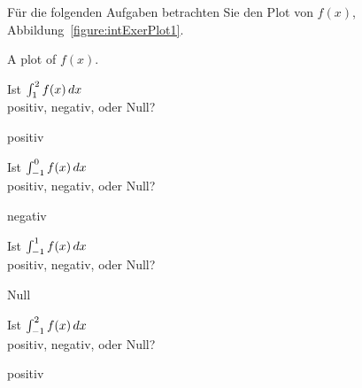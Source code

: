 \begin{exercises}

\noindent Für die folgenden Aufgaben betrachten Sie den Plot von $f(x)$, Abbildung~\ref{figure:intExerPlot1}.
\begin{marginfigure}
\caption{A plot of $f(x)$.}
\label{figure:intExerPlot1}
\end{marginfigure}
\twocol
\begin{exercise}
Ist $\int_1^2 f(x) \, d x$ \\
positiv, negativ, oder Null?
\begin{answer}
positiv
\end{answer}
\end{exercise}

\begin{exercise}
Ist $\int_{-1}^0 f(x) \, d x$ \\
positiv, negativ, oder Null?
\begin{answer}
negativ
\end{answer}
\end{exercise}

\begin{exercise}
Ist $\int_{-1}^1 f(x) \, d x$ \\
positiv, negativ, oder Null?
\begin{answer}
Null
\end{answer}
\end{exercise}

\begin{exercise}
Ist $\int_{-1}^2 f(x) \, d x$ \\
positiv, negativ, oder Null?
\begin{answer}
positiv
\end{answer}
\end{exercise}

\endtwocol


\end{exercises}
